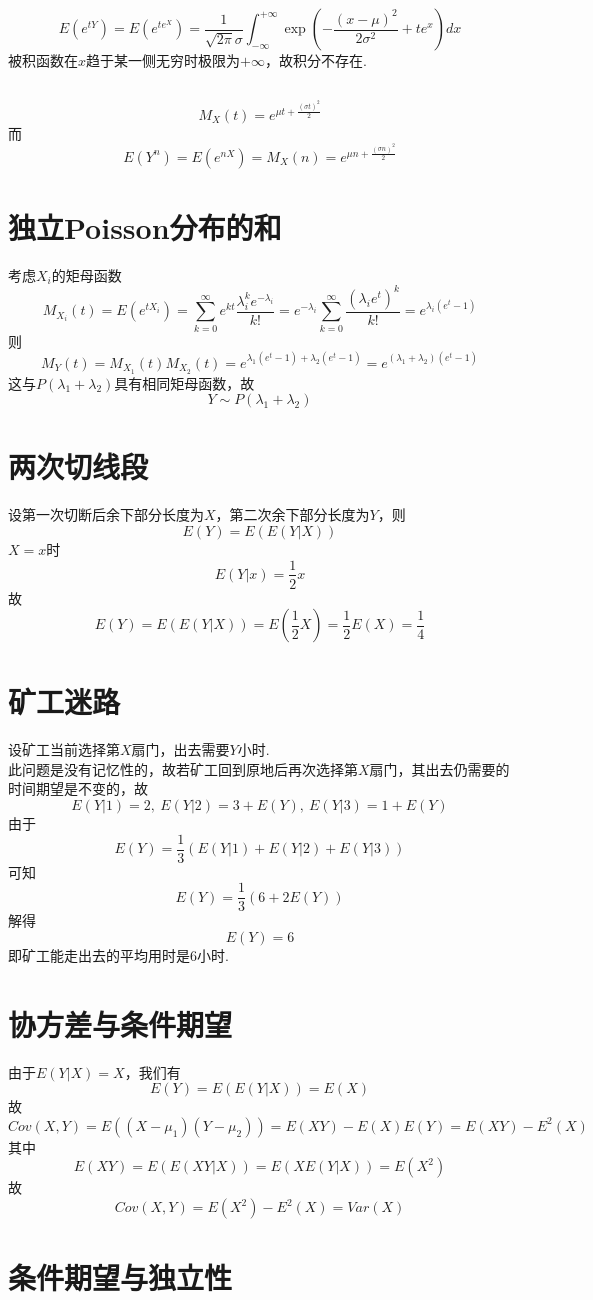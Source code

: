 \documentclass{article}
\begin{document}
\begin{CJK}{UTF8}{gbsn}
\subsection{}
$$ E(e^{tY})=E(e^{te^{X}})=\frac{1}{\sqrt{2\pi}\sigma}\int_{-\infty}^{+\infty}\exp(-\frac{(x-\mu)^{2}}{2\sigma^{2}}+te^{x})dx$$
被积函数在$x$趋于某一侧无穷时极限为$+\infty$，故积分不存在.
\subsection{}
$$ M_{X}(t)=e^{\mu t+\frac{(\sigma t)^{2}}{2}}$$
而
$$ E(Y^{n})=E(e^{nX})=M_{X}(n)=e^{\mu n+\frac{(\sigma n)^{2}}{2}}$$
\section{独立Poisson分布的和}
考虑$X_{i}$的矩母函数
$$ M_{X_{i}}(t)=E(e^{tX_{i}})=\sum\limits_{k=0}^{\infty}e^{kt}\frac{\lambda_{i}^{k}e^{-\lambda_{i}}}{k!}=e^{-\lambda_{i}}\sum\limits_{k=0}^{\infty}\frac{(\lambda_{i} e^{t})^{k}}{k!}=e^{\lambda_{i}(e^{t}-1)}$$
则
$$ M_{Y}(t)=M_{X_{1}}(t)M_{X_{2}}(t)=e^{\lambda_{1}(e^{t}-1)+\lambda_{2}(e^{t}-1)}=e^{(\lambda_{1}+\lambda_{2})(e^{t}-1)}$$
这与$P(\lambda_{1}+\lambda_{2})$具有相同矩母函数，故
$$ Y\sim P(\lambda_{1}+\lambda_{2})$$
\section{两次切线段}
设第一次切断后余下部分长度为$X$，第二次余下部分长度为$Y$，则
$$ E(Y)=E(E(Y|X))$$
$X=x$时
$$ E(Y|x)=\frac{1}{2}x$$
故
$$ E(Y)=E(E(Y|X))=E(\frac{1}{2}X)=\frac{1}{2}E(X)=\frac{1}{4}$$
\section{矿工迷路}
设矿工当前选择第$X$扇门，出去需要$Y$小时.
\\此问题是没有记忆性的，故若矿工回到原地后再次选择第$X$扇门，其出去仍需要的时间期望是不变的，故
$$ E(Y|1)=2,\ E(Y|2)=3+E(Y),\ E(Y|3)=1+E(Y)$$
由于
$$ E(Y)=\frac{1}{3}(E(Y|1)+E(Y|2)+E(Y|3))$$
可知
$$ E(Y)=\frac{1}{3}(6+2E(Y))$$
解得
$$ E(Y)=6$$
即矿工能走出去的平均用时是6小时.
\section{协方差与条件期望}
由于$E(Y|X)=X$，我们有
$$ E(Y)=E(E(Y|X))=E(X)$$
故
$$ Cov(X,Y)=E((X-\mu_{1})(Y-\mu_{2}))=E(XY)-E(X)E(Y)=E(XY)-E^{2}(X)$$
其中
$$ E(XY)=E(E(XY|X))=E(XE(Y|X))=E(X^{2})$$
故
$$ Cov(X,Y)=E(X^{2})-E^{2}(X)=Var(X)$$
\section{条件期望与独立性}

\end{CJK}
\end{document}
